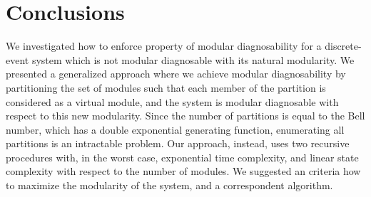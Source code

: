\documentclass[a4paper, 10pt, conference]{ieeeconf}
\begin{document}
\section{Conclusions} 
\label{sec:Conclusions}
We investigated how to enforce property of modular diagnosability for a
discrete-event system which is not modular diagnosable with its natural
modularity. We presented a generalized approach where we achieve modular
diagnosability by partitioning the set of modules such that each member of the
partition is considered as a virtual module, and the system is modular
diagnosable with respect to this new modularity. Since the number of partitions
is equal to the Bell number, which has a double exponential generating function,
enumerating all partitions is an intractable problem. Our approach, instead,
uses two recursive procedures with, in the worst case, exponential time
complexity, and linear state complexity with respect to the number of modules.
We suggested an criteria how to maximize the modularity of the system, and a
correspondent algorithm.




\end{document}
